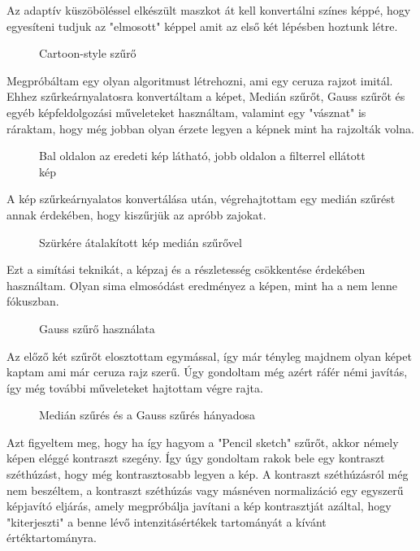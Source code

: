 Az adaptív küszöböléssel elkészült maszkot át kell konvertálni színes képpé, hogy egyesíteni tudjuk az "elmosott" képpel amit az első két lépésben hoztunk létre.
\begin{figure}[ht]
\centering
{}
\caption{Cartoon-style szűrő } 
\label{fig: cartoon5}
\end{figure}
Megpróbáltam egy olyan algoritmust létrehozni, ami egy ceruza rajzot imitál. Ehhez szűrkeárnyalatosra konvertáltam a képet, Medián szűrőt, Gauss szűrőt és egyéb képfeldolgozási műveleteket használtam, valamint egy "vásznat" is ráraktam, hogy még jobban olyan érzete legyen a képnek mint ha rajzolták volna.
\begin{figure}[ht]
\centering
{}
\caption{Bal oldalon az eredeti kép látható, jobb oldalon a filterrel ellátott kép } 
\label{fig: pencil1}
\end{figure}
A kép szűrkeárnyalatos konvertálása után, végrehajtottam egy medián szűrést annak érdekében, hogy kiszűrjük az apróbb zajokat.
\begin{figure}[ht]
\centering
{}
\caption{Szürkére átalakított kép medián szűrővel  } 
\label{fig: pencil2}
\end{figure}
Ezt a simítási teknikát, a képzaj  és a részletesség csökkentése érdekében használtam. Olyan sima elmosódást eredményez a képen, mint ha a nem lenne fókuszban.
\begin{figure}[ht]
\centering
{}
\caption{Gauss szűrő használata } 
\label{fig: pencil3}
\end{figure}
Az előző két szűrőt elosztottam egymással, így már tényleg majdnem olyan képet kaptam ami már ceruza rajz szerű. Úgy gondoltam még azért ráfér némi javítás, így még további műveleteket hajtottam végre rajta.
\begin{figure}[ht] 
\centering
{}
\caption{Medián szűrés és a Gauss szűrés hányadosa } 
\label{fig: pencil4}
\end{figure}
Azt figyeltem meg, hogy ha így hagyom a "Pencil sketch" szűrőt, akkor némely képen eléggé kontraszt szegény. Így úgy gondoltam rakok bele egy kontraszt széthúzást, hogy még kontrasztosabb legyen a kép. A  kontraszt széthúzásról még nem beszéltem, a kontraszt széthúzás vagy másnéven normalizáció egy egyszerű képjavító eljárás, amely megpróbálja javítani a kép kontrasztját azáltal, hogy "kiterjeszti" a benne lévő intenzitásértékek tartományát a kívánt értéktartományra. 
